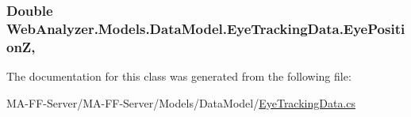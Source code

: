 \subsubsection[{Eye\+Position\+Z}]{\setlength{\rightskip}{0pt plus 5cm}Double Web\+Analyzer.\+Models.\+Data\+Model.\+Eye\+Tracking\+Data.\+Eye\+Position\+Z\hspace{0.3cm}{\ttfamily [get]}, {\ttfamily [set]}}\label{class_web_analyzer_1_1_models_1_1_data_model_1_1_eye_tracking_data_a37767ef6afd8e74c124fd0683015b4e5}


The documentation for this class was generated from the following file\+:\begin{DoxyCompactItemize}
\item 
M\+A-\/\+F\+F-\/\+Server/\+M\+A-\/\+F\+F-\/\+Server/\+Models/\+Data\+Model/\hyperlink{_eye_tracking_data_8cs}{Eye\+Tracking\+Data.\+cs}\end{DoxyCompactItemize}
